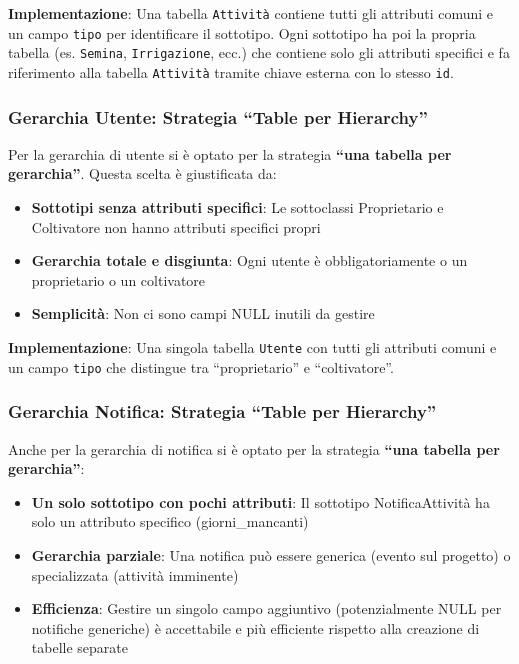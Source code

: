 \documentclass[12pt,a4paper]{article}
\begin{document}
\textbf{Implementazione}: Una tabella \texttt{Attività} contiene tutti gli attributi comuni e un campo \texttt{tipo} per identificare il sottotipo. Ogni sottotipo ha poi la propria tabella (es. \texttt{Semina}, \texttt{Irrigazione}, ecc.) che contiene solo gli attributi specifici e fa riferimento alla tabella \texttt{Attività} tramite chiave esterna con lo stesso \texttt{id}.

\subsubsection{Gerarchia Utente: Strategia ``Table per Hierarchy''}

Per la gerarchia di utente si è optato per la strategia \textbf{``una tabella per gerarchia''}. Questa scelta è giustificata da:

\begin{itemize}
    \item \textbf{Sottotipi senza attributi specifici}: Le sottoclassi Proprietario e Coltivatore non hanno attributi specifici propri
    \item \textbf{Gerarchia totale e disgiunta}: Ogni utente è obbligatoriamente o un proprietario o un coltivatore
    \item \textbf{Semplicità}: Non ci sono campi NULL inutili da gestire
\end{itemize}

\textbf{Implementazione}: Una singola tabella \texttt{Utente} con tutti gli attributi comuni e un campo \texttt{tipo} che distingue tra ``proprietario'' e ``coltivatore''.

\subsubsection{Gerarchia Notifica: Strategia ``Table per Hierarchy''}

Anche per la gerarchia di notifica si è optato per la strategia \textbf{``una tabella per gerarchia''}:

\begin{itemize}
    \item \textbf{Un solo sottotipo con pochi attributi}: Il sottotipo NotificaAttività ha solo un attributo specifico (giorni\_mancanti)
    \item \textbf{Gerarchia parziale}: Una notifica può essere generica (evento sul progetto) o specializzata (attività imminente)
    \item \textbf{Efficienza}: Gestire un singolo campo aggiuntivo (potenzialmente NULL per notifiche generiche) è accettabile e più efficiente rispetto alla creazione di tabelle separate
\end{itemize}
\end{document}
